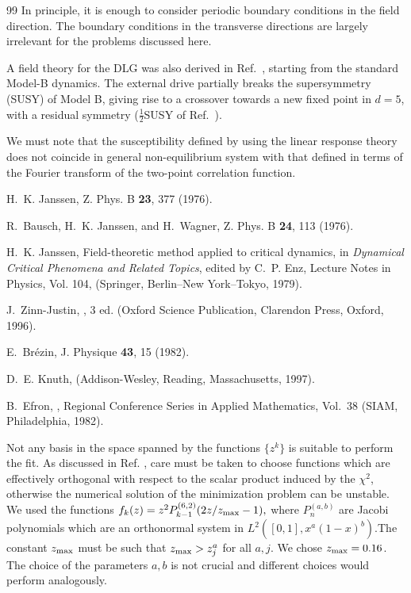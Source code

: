 \documentclass[12pt]{article}
\newcommand{\text}{\rm}
\begin{document}
\begin{thebibliography}{99}
In principle, it is enough to consider periodic boundary conditions in the
field direction. The boundary conditions in the transverse directions
are largely irrelevant for the problems discussed here.

A field theory for the DLG was also derived in Ref.~\cite{GawKupi86},
starting from the standard Model-B dynamics.
The external drive partially breaks the supersymmetry (SUSY) of Model B, 
giving rise to a crossover towards a new fixed point in $d=5$, 
with a residual symmetry ($\frac{1}{2}$SUSY of Ref.~\cite{GawKupi86}).

We must note that the susceptibility  defined by using the
  linear response theory does not coincide in general non-equilibrium system
  with that defined in terms of the Fourier transform of the two-point
  correlation function.

H.~K. Janssen,
\newblock Z. Phys. B {\bf 23}, 377 (1976).

R.~Bausch, H.~K. Janssen, and H.~Wagner,
\newblock Z. Phys. B {\bf 24}, 113 (1976).

H.~K. Janssen,
\newblock Field-theoretic method applied to critical dynamics,
\newblock in {\em Dynamical Critical Phenomena and Related Topics}, edited by
  C.~P. Enz, Lecture Notes in Physics, Vol. 104, (Springer,
  Berlin--New York--Tokyo, 1979).

J.~Zinn-Justin,
, 3 ed. (Oxford
  Science Publication, Clarendon Press, Oxford, 1996).

E.~Br\'ezin,
\newblock J. Physique {\bf 43}, 15 (1982).

D.~E. Knuth,
 (Addison-Wesley, Reading, Massachusetts, 1997).

B.~Efron,
,
  Regional Conference Series in Applied Mathematics, Vol.~38 (SIAM,
  Philadelphia, 1982).

Not any basis in the space spanned by the functions $\{ z^k \}$ is suitable to
perform the fit. As discussed in Ref. \cite{Mana-etal-97},
care must be taken to choose functions which are
effectively orthogonal with respect to the scalar product induced by the
$\chi^2$, otherwise the numerical solution
of the minimization problem can be unstable.
We used the functions
$
f_k(z) = z^2 P^{(6,2)}_{k-1}(2 z/z_{\text{max}}-1) ,
$
where $P^{(a,b)}_n$ are Jacobi polynomials which are an orthonormal system in
$L^2([0,1],x^a (1-x)^b)$.The constant $z_{\text{max}}$ must be such that
$z_{\text{max}} > z^a_j$ for all $a,j$. We chose $z_{\text{max}}=0.16$.
The choice of the parameters $a,b$ is
not crucial and different choices would perform analogously.


\end{thebibliography}
\end{document}
